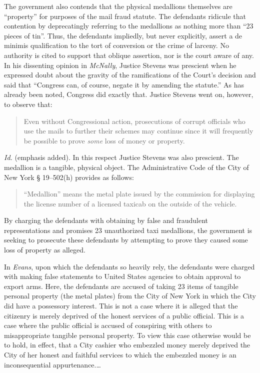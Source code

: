 The government also contends that the physical medallions themselves are
``property'' for purposes of the mail fraud statute. The defendants ridicule
that contention by deprecatingly referring to the medallions as nothing more
than ``23 pieces of tin''. Thus, the defendants impliedly, but never
explicitly, assert a de minimis qualification to the tort of conversion or the
crime of larceny. No authority is cited to support that oblique assertion, nor
is the court aware of any. In his dissenting opinion in \textit{McNally},
Justice Stevens was prescient when he expressed doubt about the gravity of the
ramifications of the Court's decision and said that ``Congress can, of course,
negate it by amending the statute.'' As has already been noted, Congress did
exactly that. Justice Stevens went on, however, to observe that:
\begin{quote}
Even without Congressional action, prosecutions of corrupt officials who use the
mails to further their schemes may continue since it will frequently be
possible to prove \textit{some} loss of money or property.
\end{quote}
\textit{Id.} (emphasis added). In this respect Justice Stevens was also
prescient. The medallion is a tangible, physical object. The Administrative
Code of the City of New York {\S} 19--502(h) provides as follows:
\begin{quote}
``Medallion'' means the metal plate issued by the commission for displaying
the license number of a licensed taxicab on the outside of the vehicle.
\end{quote}
By charging the defendants with obtaining by false and fraudulent
representations and promises 23 unauthorized taxi medallions, the government is
seeking to prosecute these defendants by attempting to prove they caused some
loss of property as alleged.

In \textit{Evans}, upon which the defendants so heavily rely, the defendants
were charged with making false statements to United States agencies to obtain
approval to export arms. Here, the defendants are accused of taking 23 items of
tangible personal property (the metal plates) from the City of New York in
which the City did have a possessory interest. This is not a case where it is
alleged that the citizenry is merely deprived of the honest services of a
public official. This is a case where the public official is accused of
conspiring with others to misappropriate tangible personal property. To view
this case otherwise would be to hold, in effect, that a City cashier who
embezzled money merely deprived the City of her honest and faithful services to
which the embezzled money is an inconsequential appurtenance.\ldots

